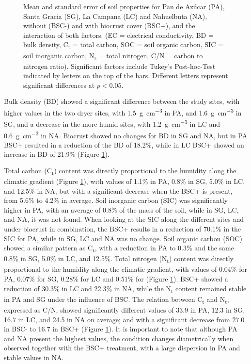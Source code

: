 \begin{figure}[htbp]
    \caption{Mean and standard error of soil properties for Pan de Azúcar (PA), Santa Gracia (SG), La Campana (LC) and Nahuelbuta (NA), without (BSC-) and with biocrust cover (BSC+), and the interaction of both factors. (EC = electrical conductivity, BD = bulk density, C\textsubscript{t} = total carbon, SOC = soil organic carbon, SIC = soil inorganic carbon, N\textsubscript{t} = total nitrogen, C/N = carbon to nitrogen ratio). Significant factors include Tukey's Post-hoc-Test indicated by letters on the top of the bars. Different letters represent significant differences at $p <0.05$.}
    \label{fig:M1-F2-soil_properties_panel} %

\end{figure}

\FloatBarrier

Bulk density (BD) showed a significant difference between the study sites, with higher values in the two dryer sites, with \SI{1.5}{\gram\per\cubic\centi\meter} in PA, and \SI{1.6}{\gram\per\cubic\centi\meter} in SG, and a decrease in the more humid sites, with \SI{1.2}{\gram\per\cubic\centi\meter} in LC and \SI{0.6}{\gram\per\cubic\centi\meter} in NA. Biocrust showed no changes for BD in SG and NA, but in PA BSC+ resulted in a reduction of the BD of 18.2\%, while in LC BSC+ showed an increase in BD of 21.9\% (Figure \ref{fig:M1-F2-soil_properties_panel}).

Total carbon (C\textsubscript{t}) content was directly proportional to the humidity along the climatic gradient (Figure \ref{fig:M1-F2-soil_properties_panel}), with values of 1.1\% in PA, 0.8\% in SG, 5.0\% in LC, and 12.5\% in NA, but with a significant decrease when the BSC+ is present, from 5.6\% to 4.2\% in average. Soil inorganic carbon (SIC) was significantly higher in PA, with an average of 0.8\% of the mass of the soil, while in SG, LC, and NA, it was not found. When looking at the SIC along the different sites and under biocrust in combination, the BSC+ results in a reduction of 70.1\% in the SIC for PA, while in SG, LC and NA was no change. Soil organic carbon (SOC) showed a similar pattern as C\textsubscript{t}, with a reduction in PA to 0.3\% and the same 0.8\% in SG, 5.0\% in LC, and 12.5\%. Total nitrogen (N\textsubscript{t}) content was directly proportional to the humidity along the climatic gradient, with values of 0.04\% for PA, 0.07\% for SG, 0.28\% for LC and 0.51\% for (Figure \ref{fig:M1-F2-soil_properties_panel}). BSC+ showed a reduction of 30.3\% in LC and 22.3\% in NA, while the N\textsubscript{t} content remained stable in PA and SG under the influence of BSC. The relation between C\textsubscript{t} and N\textsubscript{t}, expressed as C/N, showed significantly different values of 33.9 in PA, 12.3 in SG, 16.7 in LC, and 24.5 in NA on average; and with a significant decrease from 27.0 in BSC- to 16.7 in BSC+ (Figure \ref{fig:M1-F2-soil_properties_panel}). It is important to note that although PA and NA present the highest values, the condition changes diametrically when observed together with the BSC+ treatment, with a large dispersion in PA and stable values in NA.


